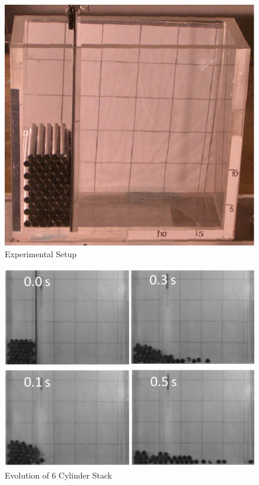 \begin{figure}[htb!]
\centering
\setlength\fboxsep{0pt}
      \includegraphics[scale=0.3]{figures/exp_setup.png} 
\caption{{\small{Experimental Setup}}}
\label{fig:exp_setup}
\end{figure}

\begin{figure}[htb!]
\centering
\setlength\fboxsep{0pt}
      \includegraphics[scale=0.3]{figures/sysEvol.png} 
\caption{{\small{Evolution of 6 Cylinder Stack}}}
\label{fig:sys_state}
\end{figure}

